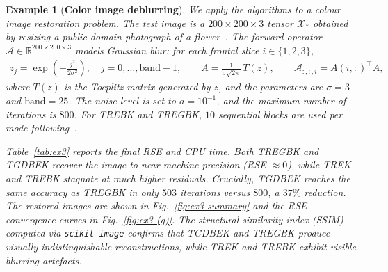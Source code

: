 \documentclass[11pt]{article}
\newtheorem{example}[theorem]{Example}
\def\fm#1{\mathcal{#1}}
\begin{document}
\begin{example}[\textbf{Color image deblurring}] \label{ex:color-image}
We apply the algorithms to a colour image restoration problem. The test image is a $200\times 200\times 3$ tensor $\fm X_\ast$ obtained by resizing a public-domain photograph of a flower~\cite{hlevkin}. The forward operator $\fm A \in \mathbb{R}^{200\times 200\times 3}$ models Gaussian blur: for each frontal slice $i\in\{1,2,3\}$,
\begin{align*}
z_j = \exp\!\left(-\frac{j^2}{2\sigma^2}\right),\quad j=0,\ldots,\mathrm{band}-1, \qquad
A = \frac{1}{\sigma\sqrt{2\pi}}\,T(z), \qquad \fm A_{:,:,i} = A(i,:)^\top A,
\end{align*}
where $T(z)$ is the Toeplitz matrix generated by $z$, and the parameters are $\sigma = 3$ and $\mathrm{band} = 25$. The noise level is set to $a = 10^{-1}$, and the maximum number of iterations is $800$. For TREBK and TREGBK, $10$ sequential blocks are used per mode following~\cite{du2020rando}.

Table~\ref{tab:ex3} reports the final RSE and CPU time. Both TREGBK and TGDBEK recover the image to near-machine precision (RSE $\approx 0$), while TREK and TREBK stagnate at much higher residuals. Crucially, TGDBEK reaches the same accuracy as TREGBK in only $503$ iterations versus $800$, a $37\%$ reduction. The restored images are shown in Fig.~\ref{fig:ex3-summary} and the RSE convergence curves in Fig.~\ref{fig:ex3-(g)}. The structural similarity index (SSIM) computed via \texttt{scikit-image} confirms that TGDBEK and TREGBK produce visually indistinguishable reconstructions, while TREK and TREBK exhibit visible blurring artefacts.
\end{example}
\end{document}
